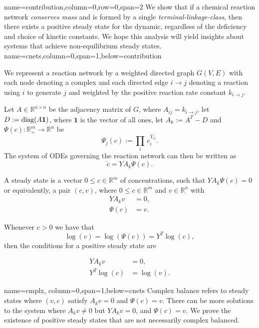 \documentclass[landscape]{baposter}
\newcommand*{\diag}{\mbox{\rm diag}}
\newcommand*{\0}{\mathbf{0}}
\newcommand*{\1}{\mathbf{1}}
\newcommand*{\R}{\mathbb{R}}
\begin{document}
\begin{poster}
{   }
 {
 name=contribution,column=0,row=0,span=2
 }
 {
 We show that if a chemical reaction network {\em conserves mass} and is formed by a single {\em terminal-linkage-class}, then
 there exists a positive steady state for the dynamic, regardless of the deficiency and choice of kinetic constants.
 We hope this analysis will yield insights about systems that achieve non-equilibrium steady states.
 }
 {
 name=cnets,column=0,span=1,below=contribution
 }
 {
\parskip 2pt 
We represent a reaction network by a weighted directed graph
$G(V,E)$ with each node denoting a complex and each directed edge
$i\rightarrow j$ denoting a reaction using $i$ to generate $j$ and weighted by
the positive reaction rate constant $k_{i\rightarrow j}$.

Let $A \in \R^{n
\times n}$ be the adjacency matrix of $G$, where
$A_{ij}=k_{i\rightarrow j}$, let  $D := \diag(A\1)$, where $\1$ is the
vector of all ones, let $A_k := A^T-D$ and 
$\Psi(c):\R^m_+\rightarrow \R^n$ be
\[\Psi_j(c) := \prod_i\,c_i^{Y_{ij}}.\] The
system of ODEs governing the reaction network can then be written as \[\dot{c} =
YA_k\Psi(c).\]

A steady state is a vector $0\leq c\in\R^m$ of concentrations, such that $YA_k\Psi(c)=0$ or equivalently, a pair
$(c,v)$, where $0\leq c\in\R^m$ and $v\in\R^n$ with
\begin{align} YA_kv &=0, \label{fb}\tag{FB} \\ \Psi(c)
  &= v. \label{mak}\tag{MA} \end{align}

Whenever $c>0$ we have that \[\log(v) = \log(\Psi(c)) = Y^T\log(c),\] then the conditions 
for a positive steady state are

\begin{align}
  YA_kv &=0 \tag{FB}, \\ 
   Y^T\log(c) &= \log(v). \label{mak-alt}\tag{MA-Log}
\end{align} 
}

{name=cmplx, column=0,span=1,below=cnets}
{
Complex balance refers to steady states where $(v,c)$ satisfy
$A_kv=0$ and $\Psi(c)=v$. There can be more solutions to the system where
$A_kv \neq 0$ but $YA_kv=0$, and $\Psi(c)=v$. We prove the existence of positive 
steady states that are not necessarily complex balanced.
}



\end{poster}
\end{document}
